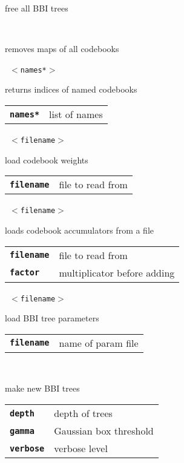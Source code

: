 \begin{description}
\begin{description}
        free all BBI trees

       \texttt{} \

        removes maps of all codebooks

       \texttt{ $<$names*$>$} \

        returns indices of named codebooks

      \begin{tabular}{ll}
 \texttt{\textbf{names*}} & list of names \\
      \end{tabular}
       \texttt{ $<$filename$>$} \

        load codebook weights

      \begin{tabular}{ll}
 \texttt{\textbf{filename}} &  file to read from  \\
      \end{tabular}
       \texttt{ $<$filename$>$ } \

        loads codebook accumulators from a file

      \begin{tabular}{ll}
 \texttt{\textbf{filename}} &  file to read from  \\
 \texttt{\textbf{factor}} &     multiplicator before adding  \\
      \end{tabular}
       \texttt{ $<$filename$>$} \

        load BBI tree parameters

      \begin{tabular}{ll}
 \texttt{\textbf{filename}} &  name of param file  \\
      \end{tabular}
       \texttt{   } \

        make new BBI trees

      \begin{tabular}{ll}
 \texttt{\textbf{depth}} &    depth of trees  \\
 \texttt{\textbf{gamma}} &    Gaussian box threshold  \\
 \texttt{\textbf{verbose}} &  verbose level  \\
      \end{tabular}
       \texttt{} \


\end{description}
\end{description}
